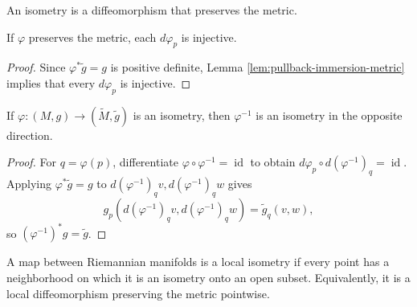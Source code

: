 \begin{definition}[Isometry]
\label{def:isometry}





An isometry is a diffeomorphism that preserves the metric.
\end{definition}

\begin{lemma}
\label{lem:metric-preserving-immersion}





If $\varphi$ preserves the metric, each $d\varphi_p$ is injective.
\end{lemma}
\begin{proof}

\sketch Since $\varphi^*\widetilde g=g$ is positive definite, Lemma \ref{lem:pullback-immersion-metric} implies that every $d\varphi_p$ is injective.
\end{proof}

\begin{lemma}
\label{lem:isometry-symm}





If $\varphi:(M,g)\to(\widetilde M,\widetilde g)$ is an isometry, then $\varphi^{-1}$ is an isometry in the opposite direction.
\end{lemma}
\begin{proof}

\sketch For $q=\varphi(p)$, differentiate $\varphi\circ\varphi^{-1}=\operatorname{id}$ to obtain $d\varphi_p\circ d(\varphi^{-1})_q=\operatorname{id}$. Applying $\varphi^*\widetilde g=g$ to $d(\varphi^{-1})_qv,d(\varphi^{-1})_qw$ gives
\[
g_p(d(\varphi^{-1})_qv,d(\varphi^{-1})_qw)=\widetilde g_q(v,w),
\]
so $(\varphi^{-1})^*g=\widetilde g$.
\end{proof}

\begin{definition}
\label{def:local-isometry}





A map between Riemannian manifolds is a local isometry if every point has a neighborhood on which it is an isometry onto an open subset. Equivalently, it is a local diffeomorphism preserving the metric pointwise.
\end{definition}

